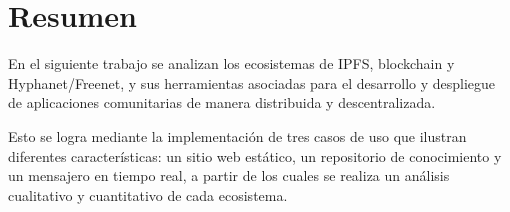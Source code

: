 \section{Resumen}

En el siguiente trabajo se analizan los ecosistemas de IPFS, blockchain y Hyphanet/Freenet, y sus herramientas asociadas para el desarrollo y despliegue de aplicaciones comunitarias de manera distribuida y descentralizada.

Esto se logra mediante la implementación de tres casos de uso que ilustran diferentes características: un sitio web estático, un repositorio de conocimiento y un mensajero en tiempo real, a partir de los cuales se realiza un análisis cualitativo y cuantitativo de cada ecosistema.